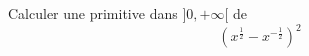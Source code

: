 Calculer une primitive dans $]0,+\infty[$ de 
\begin{displaymath}
 \left( x^{\frac{1}{2}}-x^{-\frac{1}{2}}\right)^2 
\end{displaymath}

\bigskip
